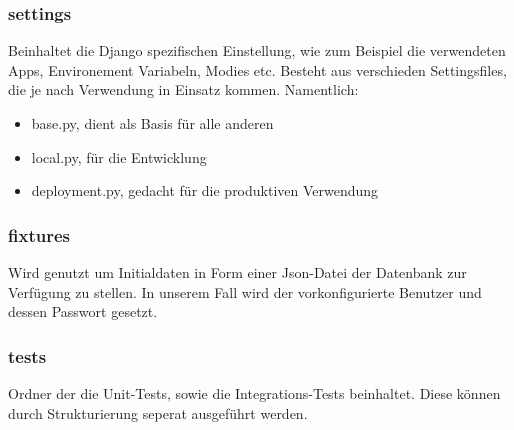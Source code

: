 \subsubsection{settings}
Beinhaltet die Django spezifischen Einstellung, wie zum Beispiel die verwendeten Apps, Environement Variabeln, Modies etc. Besteht aus verschieden Settingsfiles, die je nach Verwendung in Einsatz kommen. Namentlich:
\begin{itemize}
    \item base.py, dient als Basis für alle anderen
    \item local.py, für die Entwicklung
    \item deployment.py, gedacht für die produktiven Verwendung 
\end{itemize}

\subsubsection{fixtures}
Wird genutzt um Initialdaten in Form einer Json-Datei der Datenbank zur Verfügung zu stellen. In unserem Fall wird der vorkonfigurierte Benutzer und dessen Passwort gesetzt.

\subsubsection{tests}
Ordner der die Unit-Tests, sowie die Integrations-Tests beinhaltet. Diese können durch Strukturierung seperat ausgeführt werden.
\newpage